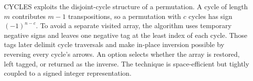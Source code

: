 \documentclass[10pt,letterpaper]{article}
\begin{document}
\begin{tcolorbox}[colback=Ink!4,colframe=Ink,title=Cornell summary]
CYCLES exploits the disjoint-cycle structure of a permutation. A cycle of length $m$ contributes $m-1$ transpositions, so a permutation with $c$ cycles has sign $(-1)^{n-c}$. To avoid a separate visited array, the algorithm uses temporary negative signs and leaves one negative tag at the least index of each cycle. Those tags later delimit cycle traversals and make in-place inversion possible by reversing every cycle's arrows. An option selects whether the array is restored, left tagged, or returned as the inverse. The technique is space-efficient but tightly coupled to a signed integer representation.
\end{tcolorbox}
\end{document}
